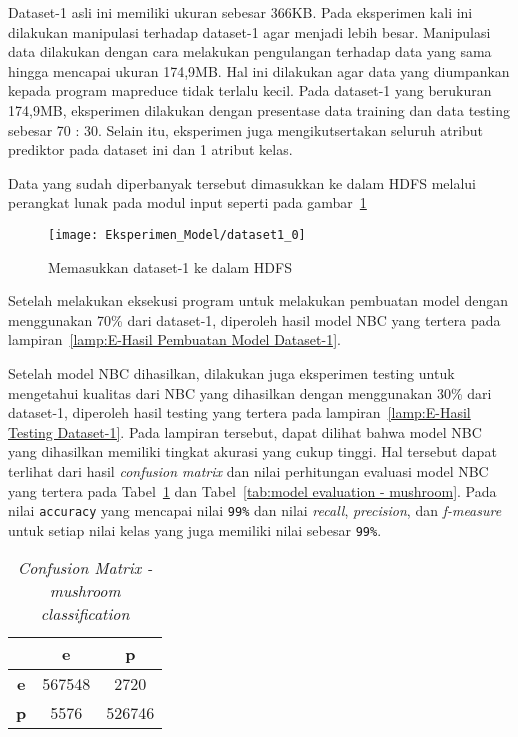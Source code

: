 Dataset-1 asli ini memiliki ukuran sebesar 366KB. Pada eksperimen kali ini dilakukan manipulasi terhadap dataset-1 agar menjadi lebih besar. Manipulasi data dilakukan dengan cara melakukan pengulangan terhadap data yang sama hingga mencapai ukuran 174,9MB. Hal ini dilakukan agar data yang diumpankan kepada program mapreduce tidak terlalu kecil. Pada dataset-1 yang berukuran 174,9MB, eksperimen dilakukan dengan presentase data training dan data testing sebesar 70 : 30. Selain itu, eksperimen juga mengikutsertakan seluruh atribut prediktor pada dataset ini dan 1 atribut kelas.

Data yang sudah diperbanyak tersebut dimasukkan ke dalam HDFS melalui perangkat lunak pada modul input seperti pada gambar~\ref{fig:Memasukkan dataset-1 ke dalam HDFS}

\begin{figure}[H]
	\centering
	\texttt{[image: Eksperimen\_Model/dataset1\_0]}
	\caption[Memasukkan dataset-1 ke dalam HDFS]{Memasukkan dataset-1 ke dalam HDFS}
	\label{fig:Memasukkan dataset-1 ke dalam HDFS}
\end{figure}

Setelah melakukan eksekusi program untuk melakukan pembuatan model dengan menggunakan 70\% dari dataset-1, diperoleh hasil model NBC yang tertera pada lampiran~\ref{lamp:E-Hasil Pembuatan Model Dataset-1}.

Setelah model NBC dihasilkan, dilakukan juga eksperimen testing untuk mengetahui kualitas dari NBC yang dihasilkan dengan menggunakan 30\% dari dataset-1, diperoleh hasil testing yang tertera pada lampiran~\ref{lamp:E-Hasil Testing Dataset-1}. Pada lampiran tersebut, dapat dilihat bahwa model NBC yang dihasilkan memiliki tingkat akurasi yang cukup tinggi. Hal tersebut dapat terlihat dari hasil \textit{confusion matrix} dan nilai perhitungan evaluasi model NBC yang tertera pada Tabel~\ref{tab:confusion matrix - mushroom} dan Tabel~\ref{tab:model evaluation - mushroom}. Pada nilai \texttt{accuracy} yang mencapai nilai \texttt{99\%} dan nilai \textit{recall}, \textit{precision}, dan \textit{f-measure} untuk setiap nilai kelas yang juga memiliki nilai sebesar \texttt{99\%}.

\begin{table}[H]
\label{tab:confusion matrix - mushroom}
\centering
\caption{\textit{Confusion Matrix - mushroom classification}}
\begin{tabular}{ | c | c | c | }
\hline
& \textbf{e} & \textbf{p}\\ \hline \hline
\textbf{e} & 567548 & 2720 \\ \hline
\textbf{p} & 5576 & 526746 \\ \hline
\end{tabular}
\end{table}

